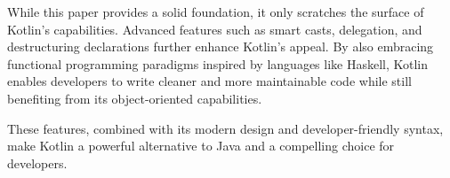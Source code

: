 \documentclass[a4paper,11pt]{article}
\begin{document}
While this paper provides a solid foundation, it only scratches the surface of Kotlin's capabilities. Advanced features such as smart casts, delegation, and destructuring declarations further enhance Kotlin's appeal. By also embracing functional programming paradigms inspired by languages like Haskell, Kotlin enables developers to write cleaner and more maintainable code while still benefiting from its object-oriented capabilities.

These features, combined with its modern design and developer-friendly syntax, make Kotlin a powerful alternative to Java and a compelling choice for developers.

\newpage
\printbibliography
\end{document}
